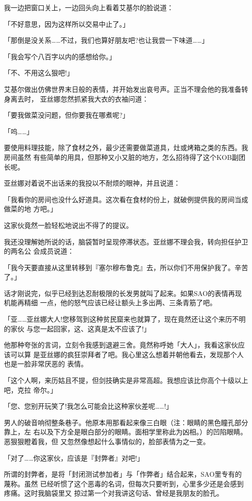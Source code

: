 \documentclass[11pt]{book}
\begin{document}
我一边把窗口关上，一边回头向上看着艾基尔的脸说道：

「不好意思，因为这样所以交易中止了。」

「那倒是没关系……不过，我们也算好朋友吧?也让我尝一下味道……」

「我会写个八百字以内的感想给你。」

「不、不用这么狠吧!」

艾基尔做出仿佛世界末日般的表情，并开始发出哀号声。正当不理会他的我准备转身离去时，
亚丝娜忽然抓紧我大衣的衣袖问道：

「要我做菜没问题，但你要我在哪煮呢?」

「呜……」

要使用料理技能，除了食材之外，最少还需要做菜道具，灶或烤箱之类的东西。我房间虽然
有些简单的用具，但那种又小又脏的地方，怎么招待得了这个KOB副团长呢。

亚丝娜对着说不出话来的我投以不耐烦的眼神，并且说道：

「我看你的房间也没什么好道具。这次看在食材的份上，就破例提供我的房间当成做菜的地
方吧。」

这家伙竟然一脸轻松地说出不得了的提议。

我还没理解她所说的话，脑袋暂时呈现停滞状态。亚丝娜不理会我，转向担任护卫的两名公
会成员说道：

「我今天要直接从这里转移到『塞尔穆布鲁克』去，所以你们不用保护我了。辛苦了。」

话才刚说完，似乎已经到达忍耐极限的长发男就叫了起来。如果SAO的表情再现机能再精细
一点，他的怒气应该已经让额头上多出两、三条青筋了吧。

「亚……亚丝娜大人!您移驾到这种贫民窟来也就算了，现在竟然还让这个来历不明的家伙
与您一起回家，这、这真是太不应该了!」

他那种夸张的言词，立刻令我感到退避三舍。竟然称呼她「大人」，我看这家伙应该可以算
是亚丝娜的疯狂崇拜者了吧。我心里这么想着并朝他看去，发现那个人也是一脸非常厌恶的
表情。

「这个人啊，来历姑且不提，但剑技确实是非常高超。我想应该比你高个十级以上吧，克拉
帝尔。」

「您、您别开玩笑了!我怎么可能会比这种家伙差呢……!」

男人的破音响彻整条巷子。他原本用那看起来像三白眼（注：眼睛的黑色瞳孔部分靠上，左
右以及下方全是眼白部分的眼睛。面相学里称此为凶相。）的凹陷眼睛。恶狠狠瞪着我，但
又忽然像想起什么事情似的，脸部表情为之一变。

「对了……你这家伙，应该是『封弊者』对吧!」

所谓的封弊者，是将「封闭测试参加者」与「作弊者」结合起来，SAO里专有的蔑称。虽然
已经听惯了这个恶毒的名词，但每次只要听到，心里多少还是会感到疼痛。这时我脑袋里又
掠过第一个对我讲这句话、曾经是我朋友的脸孔。
\end{document}
